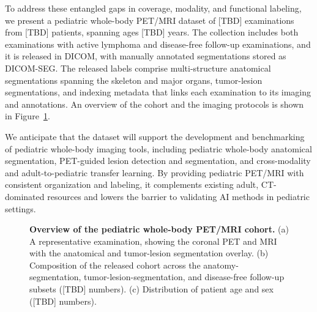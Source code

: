 To address these entangled gaps in coverage, modality, and functional labeling, we present a pediatric whole-body PET/MRI dataset of [TBD] examinations from [TBD] patients, spanning ages [TBD] years.
The collection includes both examinations with active lymphoma and disease-free follow-up examinations, and it is released in DICOM, with manually annotated segmentations stored as DICOM-SEG.
The released labels comprise multi-structure anatomical segmentations spanning the skeleton and major organs, tumor-lesion segmentations, and indexing metadata that links each examination to its imaging and annotations.
An overview of the cohort and the imaging protocols is shown in Figure~\ref{fig:cohort}.

We anticipate that the dataset will support the development and benchmarking of pediatric whole-body imaging tools, including pediatric whole-body anatomical segmentation, PET-guided lesion detection and segmentation, and cross-modality and adult-to-pediatric transfer learning.
By providing pediatric PET/MRI with consistent organization and labeling, it complements existing adult, CT-dominated resources and lowers the barrier to validating AI methods in pediatric settings.

\begin{figure}[t]
\centering
{}
\caption{\textbf{Overview of the pediatric whole-body PET/MRI cohort.}
(a) A representative examination, showing the coronal PET and MRI with the
anatomical and tumor-lesion segmentation overlay.
(b) Composition of the released cohort across the anatomy-segmentation,
tumor-lesion-segmentation, and disease-free follow-up subsets ([TBD] numbers).
(c) Distribution of patient age and sex ([TBD] numbers).}
\label{fig:cohort}
\end{figure}
